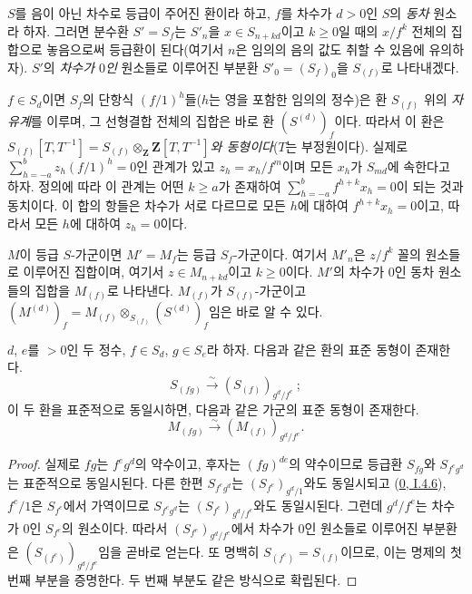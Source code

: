 \begin{env}[2.2.1]
\label{II.2.2.1-ko}
$S$를 음이 아닌 차수로 등급이 주어진 환이라 하고, $f$를 차수가
$d>0$인 $S$의 \emph{동차} 원소라 하자. 그러면 분수환 $S'=S_f$는
$S'_n$을 $x\in S_{n+kd}$이고 $k\geq 0$일 때의 $x/f^k$ 전체의
집합으로 놓음으로써 등급환이 된다(여기서 $n$은 임의의 음의 값도 취할
수 있음에 유의하자). $S'$의 \emph{차수가 $0$인} 원소들로 이루어진
부분환 $S'_0=(S_f)_0$을 $S_{(f)}$로 나타내겠다.

$f\in S_d$이면 $S_f$의 단항식 $(f/1)^h$들($h$는 영을 포함한 임의의
정수)은 환 $S_{(f)}$ 위의 \emph{자유계}를 이루며, 그 선형결합 전체의
집합은 바로
환 $(S^{(d)})_f$이다. 따라서 이 환은
\emph{$S_{(f)}[T,T^{-1}]=S_{(f)}\otimes_{\mathbf{Z}}\mathbf{Z}[T,T^{-1}]$와
동형이다}($T$는 부정원이다). 실제로
$\sum_{h=-a}^{b}z_h(f/1)^h=0$인 관계가 있고 $z_h=x_h/f^m$이며 모든
$x_h$가 $S_{md}$에 속한다고 하자. 정의에 따라 이 관계는
어떤 $k\geq a$가 존재하여
$\sum_{h=-a}^{b}f^{h+k}x_h=0$이 되는 것과 동치이다. 이 합의 항들은
차수가 서로 다르므로 모든 $h$에 대하여 $f^{h+k}x_h=0$이고, 따라서
모든 $h$에 대하여 $z_h=0$이다.

$M$이 등급 $S$-가군이면 $M'=M_f$는 등급 $S_f$-가군이다. 여기서
$M'_n$은 $z/f^k$ 꼴의 원소들로 이루어진 집합이며, 여기서
$z\in M_{n+kd}$이고 $k\geq 0$이다.
$M'$의 차수가 $0$인 동차 원소들의 집합을 $M_{(f)}$로 나타낸다.
$M_{(f)}$가 $S_{(f)}$-가군이고
$(M^{(d)})_f=M_{(f)}\otimes_{S_{(f)}}(S^{(d)})_f$임은 바로 알 수 있다.
\end{env}

\begin{lemma}[2.2.2]
\label{II.2.2.2-ko}
$d$, $e$를 $>0$인 두 정수, $f\in S_d$, $g\in S_e$라 하자. 다음과 같은
환의 표준 동형이 존재한다.
\[
  S_{(fg)}\xrightarrow{\sim}(S_{(f)})_{g^d/f^e}~;
\]
이 두 환을 표준적으로 동일시하면, 다음과 같은 가군의 표준 동형이
존재한다.
\[
  M_{(fg)}\xrightarrow{\sim}(M_{(f)})_{g^d/f^e}.
\]
\end{lemma}

\begin{proof}
실제로 $fg$는 $f^e g^d$의 약수이고, 후자는 $(fg)^{de}$의 약수이므로
등급환 $S_{fg}$와 $S_{f^e g^d}$는 표준적으로 동일시된다. 다른 한편
$S_{f^e g^d}$는 $(S_{f^e})_{g^d/1}$와도 동일시되고
(\hyperref[0.1.4.6-ko]{0, I.4.6}), $f^e/1$은 $S_{f^e}$에서 가역이므로
$S_{f^e g^d}$는 $(S_{f^e})_{g^d/f^e}$와도 동일시된다. 그런데
$g^d/f^e$는 차수가 $0$인 $S_{f^e}$의 원소이다. 따라서
$(S_{f^e})_{g^d/f^e}$에서 차수가 $0$인 원소들로 이루어진 부분환은
$(S_{(f^e)})_{g^d/f^e}$임을 곧바로 얻는다. 또 명백히
$S_{(f^e)}=S_{(f)}$이므로, 이는 명제의 첫 번째 부분을 증명한다.
두 번째 부분도 같은 방식으로 확립된다.
\end{proof}


